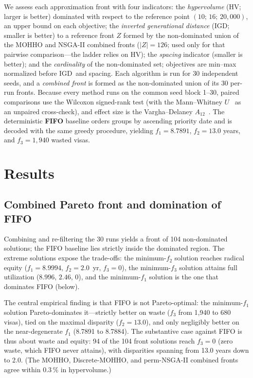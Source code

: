 \documentclass[runningheads]{llncs}
\newcommand{\HV}{\textsf{HV}}
\newcommand{\IGD}{\textsf{IGD}}
\begin{document}
We assess each approximation front with four indicators: the \emph{hypervolume} (\HV; larger is better) dominated with respect to the reference point $(10;\,16;\,20{,}000)$, an upper bound on each objective; the \emph{inverted generational distance} (\IGD; smaller is better) to a reference front $Z$ formed by the non-dominated union of the MOHHO and NSGA-II combined fronts ($|Z|=126$; used only for that pairwise comparison---the ladder relies on \HV); the \emph{spacing} indicator (smaller is better); and the \emph{cardinality} of the non-dominated set; objectives are min--max normalized before \IGD\ and spacing. Each algorithm is run for 30 independent seeds, and a \emph{combined front} is formed as the non-dominated union of its 30 per-run fronts. Because every method runs on the common seed block 1--30, paired comparisons use the Wilcoxon signed-rank test (with the Mann--Whitney $U$~\cite{derrac} as an unpaired cross-check), and effect size is the Vargha--Delaney $A_{12}$~\cite{vargha}. The deterministic \textbf{FIFO} baseline orders groups by ascending priority date and is decoded with the same greedy procedure, yielding $f_1=8.7891$, $f_2=13.0$ years, and $f_3=1{,}940$ wasted visas.



\section{Results}
\label{sec:results}

\subsection{Combined Pareto front and domination of FIFO}
\label{sec:front}

Combining and re-filtering the 30 runs yields a front of 104 non-dominated solutions; the FIFO baseline lies strictly inside the dominated region. The extreme solutions expose the trade-offs: the minimum-$f_2$ solution reaches radical equity ($f_1=8.9994$, $f_2=2.0$~yr, $f_3=0$), the minimum-$f_3$ solution attains full utilization ($8.996$, $2.46$, $0$), and the minimum-$f_1$ solution is the one that dominates FIFO (below).

The central empirical finding is that FIFO is not Pareto-optimal: the minimum-$f_1$ solution Pareto-dominates it---strictly better on waste ($f_3$ from 1{,}940 to 680 visas), tied on the maximal disparity ($f_2=13.0$), and only negligibly better on the near-degenerate $f_1$ (8.7891 to 8.7884). The substantive case against FIFO is thus about waste and equity: 94 of the 104 front solutions reach $f_3=0$ (zero waste, which FIFO never attains), with disparities spanning from 13.0 years down to 2.0. (The MOHHO, Discrete-MOHHO, and perm-NSGA-II combined fronts agree within $0.3\,\%$ in hypervolume.)
\end{document}
